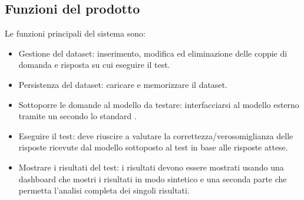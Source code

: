 
\subsection{Funzioni del prodotto}
Le funzioni principali del sistema sono:
\begin{itemize}
    \item Gestione del dataset: inserimento, modifica ed eliminazione delle coppie di domanda e risposta su cui eseguire il test.
    \item Persistenza del dataset: caricare e memorizzare il dataset.
    \item Sottoporre le domande al modello da testare: interfacciarsi al modello esterno tramite un  secondo lo standard .
    \item Eseguire il test: deve riuscire a valutare la correttezza/verosomiglianza delle risposte ricevute dal modello sottoposto al test in base alle risposte attese.
    \item Mostrare i risultati del test: i risultati devono essere mostrati usando una dashboard che mostri i risultati in modo sintetico e una seconda parte che permetta l'analisi completa dei singoli risultati.
\end{itemize}